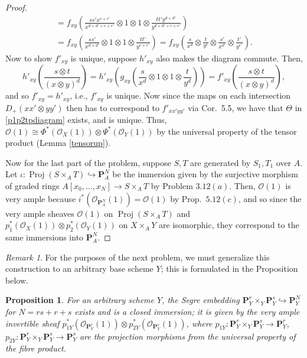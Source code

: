 \documentclass[12pt,letterpaper]{article}
\newtheorem{proposition}{Proposition}
\theoremstyle{definition}
\theoremstyle{remark}
\newtheorem*{remark}{Remark}
\numberwithin{equation}{section}
\numberwithin{figure}{problem}
\DeclareMathOperator{\Proj}{Proj}
\newcommand{\OO}{\mathcal{O}}
\begin{document}
\begin{proof}
\begin{multline*}
    = f_{xy}\left( \frac{ss'x^{e+e'}}{x^{d+d'+e+e'}} \otimes 1 \otimes 1 \otimes \frac{tt'y^{d+d'}}{y^{d+d'+e+e'}} \right)\\
    = f_{xy}\left( \frac{ss'}{x^{d+d'}} \otimes 1 \otimes 1 \otimes \frac{tt'}{y^{e+e'}} \right) = f_{xy}\left( \frac{s}{x^{d}} \otimes \frac{t}{y^e}\otimes\frac{s'}{x^{d'}}\otimes\frac{t'}{y^{e'}} \right).
  \end{multline*}
  Now to show $f'_{xy}$ is unique, suppose $h'_{xy}$ also makes the diagram commute. Then,
  \begin{equation*}
    h'_{xy}\left( \frac{s \otimes t}{(x \otimes y)^{d}} \right) = h'_{xy}\left( g_{xy}\left( \frac{s}{x^d} \otimes 1 \otimes 1 \otimes \frac{t}{y^d} \right)\right) = f'_{xy}\left( \frac{s \otimes t}{(x \otimes y)^{d}} \right),
  \end{equation*}
  and so $f'_{xy} = h'_{xy}$, i.e., $f'_{xy}$ is unique. Now since the maps on each intersection $D_+(xx' \otimes yy')$ then has to correspond to $f'_{xx'yy'}$ via Cor.~5.5, we have that $\Theta$ in \eqref{p1p2tpdiagram} exists, and is unique. Thus, $\OO(1) \cong \Phi^*(\OO_X(1)) \otimes \Psi^*(\OO_Y(1))$ by the universal property of the tensor product (Lemma \ref{tensorup}).
  \par Now for the last part of the problem, suppose $S,T$ are generated by $S_1,T_1$ over $A$. Let $\iota\colon \Proj(S \times_A T) \hookrightarrow \mathbf{P}^N_A$ be the immersion given by the surjective morphism of graded rings $A[x_0,\ldots,x_N] \to S \times_A T$ by Problem $3.12(a)$. Then, $\OO(1)$ is very ample because $i^*(\OO_{\mathbf{P}^N_A}(1)) = \OO(1)$ by Prop.~$5.12(c)$, and so since the very ample sheaves $\OO(1)$ on $\Proj(S \times_A T)$ and $p_1^*(\OO_X(1)) \otimes p_2^*(\OO_Y(1))$ on $X \times_A Y$ are isomorphic, they correspond to the same immersions into $\mathbf{P}^N_A$.
\end{proof}
\begin{remark}
  For the purposes of the next problem, we must generalize this construction to an arbitrary base scheme $Y$; this is formulated in the Proposition below.
\end{remark}
\begin{proposition}\label{segre}
  For an arbitrary scheme $Y$, the Segre embedding $\mathbf{P}_Y^r \times_Y \mathbf{P}_Y^s \hookrightarrow \mathbf{P}_Y^N$ for $N = rs + r + s$ exists and is a closed immersion; it is given by the very ample invertible sheaf $p_{1Y}^*(\OO_{\mathbf{P}_Y^r}(1)) \otimes p_{2Y}^*(\OO_{\mathbf{P}_Y^s}(1))$, where $p_{1Y}\colon\mathbf{P}_Y^r \times_Y \mathbf{P}_Y^s \to \mathbf{P}_Y^r$, $p_{2Y}\colon\mathbf{P}_Y^r \times_Y \mathbf{P}_Y^s \to \mathbf{P}_Y^s$ are the projection morphisms from the universal property of the fibre product.
\end{proposition}
\end{document}
